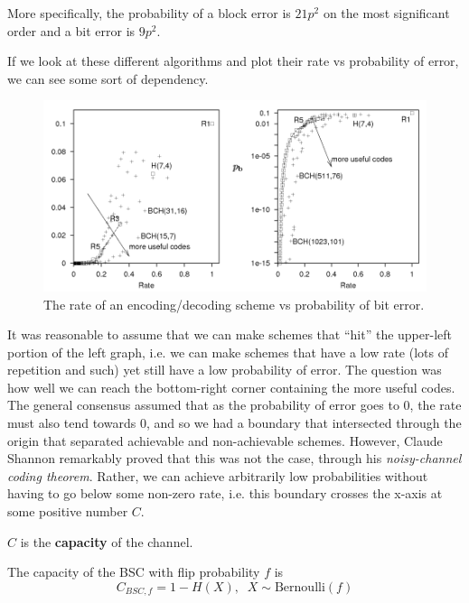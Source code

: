 \documentclass{article}
\begin{document}
    More specifically, the probability of a block error is $21p^2$ on the most significant order and a bit error is $9p^2$. 

    If we look at these different algorithms and plot their rate vs probability of error, we can see some sort of dependency. 

    \begin{figure}[H]
      \centering 
      \includegraphics[scale=0.4]{img/rate_vs_error.png}
      \caption{The rate of an encoding/decoding scheme vs probability of bit error.} 
      \label{fig:rate_vs_error}
    \end{figure}

    It was reasonable to assume that we can make schemes that ``hit'' the upper-left portion of the left graph, i.e. we can make schemes that have a low rate (lots of repetition and such) yet still have a low probability of error. The question was how well we can reach the bottom-right corner containing the more useful codes. The general consensus assumed that as the probability of error goes to $0$, the rate must also tend towards $0$, and so we had a boundary that intersected through the origin that separated achievable and non-achievable schemes. However, Claude Shannon remarkably proved that this was not the case, through his \textit{noisy-channel coding theorem}. Rather, we can achieve arbitrarily low probabilities without having to go below some non-zero rate, i.e. this boundary crosses the x-axis at some positive number $C$.  

    \begin{definition}[Capacity]
      $C$ is the \textbf{capacity} of the channel. 
    \end{definition}

    \begin{theorem}
      The capacity of the BSC with flip probability $f$ is 
      \begin{equation}
        C_{BSC, f} = 1 - H(X), \;\; X \sim \mathrm{Bernoulli}(f)
      \end{equation}
    \end{theorem}
\end{document}
